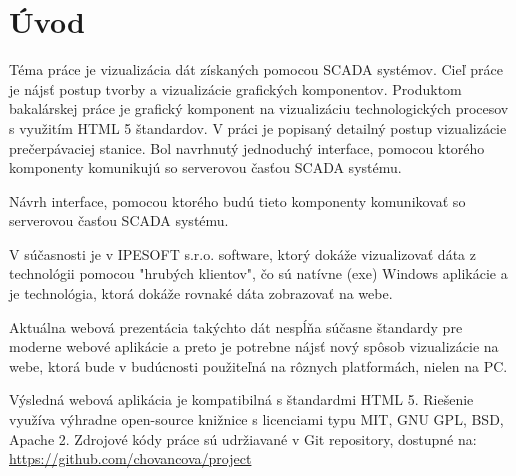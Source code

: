 \chapter*{Úvod}

Téma práce je vizualizácia dát získaných pomocou SCADA systémov. Cieľ práce je nájsť postup tvorby a vizualizácie grafických komponentov. Produktom bakalárskej práce je grafický komponent na vizualizáciu technologických procesov s využitím HTML 5 štandardov. 
V práci je popisaný detailný postup vizualizácie prečerpávaciej stanice. Bol navrhnutý jednoduchý interface, pomocou ktorého komponenty komunikujú so serverovou časťou SCADA systému. 

Návrh  interface, pomocou ktorého budú tieto komponenty komunikovať so serverovou časťou SCADA systému. 

V súčasnosti je v IPESOFT s.r.o. software, ktorý dokáže vizualizovať dáta z technológii pomocou "hrubých klientov",  čo sú natívne (exe) Windows aplikácie a je technológia,  ktorá dokáže rovnaké dáta zobrazovať na webe. 

Aktuálna webová prezentácia takýchto dát nespĺňa súčasne štandardy pre moderne webové aplikácie a preto je potrebne nájsť nový spôsob vizualizácie na webe, ktorá bude v budúcnosti použiteľná na rôznych platformách, nielen na PC. 

Výsledná webová aplikácia je kompatibilná s štandardmi HTML 5. Riešenie využíva výhradne open-source knižnice s licenciami typu MIT, GNU GPL, BSD, Apache 2. Zdrojové kódy práce sú udržiavané v Git repository, dostupné na:  \url{https://github.com/chovancova/project} 


